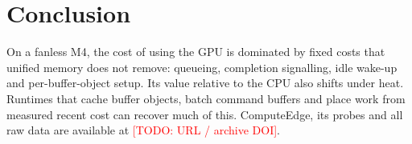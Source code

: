 \documentclass[conference,10pt]{IEEEtran}
\newcommand{\todo}[1]{\textcolor{red}{[TODO: #1]}}
\newcommand{\todo}[1]{}
\begin{document}
\section{Conclusion}

On a fanless M4, the cost of using the GPU is dominated by fixed costs that unified memory does not remove: queueing,
completion signalling, idle wake-up and per-buffer-object setup. Its value relative to the CPU also shifts under heat.
Runtimes that cache buffer objects, batch command buffers and place work from measured recent cost can recover
much of this. ComputeEdge, its probes and all raw data are available at \todo{URL / archive DOI}.



\end{document}
